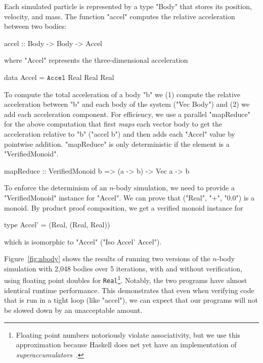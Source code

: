 Each simulated particle is represented by a
type "Body" that stores its position, velocity, and mass.
%
The function "accel" computes the relative acceleration
between two bodies:
\begin{mcode}
  accel :: Body -> Body -> Accel
\end{mcode}
where "Accel" represents the three-dimensional acceleration
\begin{mcode}
  data Accel = $\texttt{Accel}$ Real Real Real
\end{mcode}
%
To compute the total acceleration
of a body "b" we
(1) compute the relative acceleration between "b"
and each body of the system ("Vec Body") and
(2) we add each acceleration component.
%
For efficiency, we use a parallel "mapReduce" for the above
computation that
first \textit{maps} each vector body to get the acceleration relative to "b"
("accel b") and then adds each "Accel" value by pointwise addition.
%
"mapReduce" is only deterministic if the element is a "VerifiedMonoid".
\begin{mcode}
  mapReduce :: VerifiedMonoid b => (a -> b) -> Vec a -> b
\end{mcode}
%
To enforce the determinism of an $n$-body simulation, we need to provide a
"VerifiedMonoid" instance for "Accel".
%
We can prove that ("Real", "+", "0.0")
is a monoid.
%
By product proof composition, we get a verified monoid instance for
\begin{mcode}
  type Accel' = (Real, (Real, Real))
\end{mcode}
which is isomorphic to "Accel" (\ie "Iso Accel' Accel").

Figure~\ref{fig:nbody} shows the results of running two versions of the $n$-body
simulation with 2,048 bodies over 5 iterations, with and without verification,
using floating point doubles for \texttt{Real}\footnote{Floating point numbers
  notoriously violate associativity, but we use this approximation because
  Haskell does net yet have an implementation of {\em
    superaccumulators}~\cite{superaccumulation}.}. Notably, the two programs have almost
identical runtime performance.  This demonstrates that even when verifying code
that is run in a tight loop (like "accel"), we can expect that our programs
will not be slowed down by an unacceptable amount.

